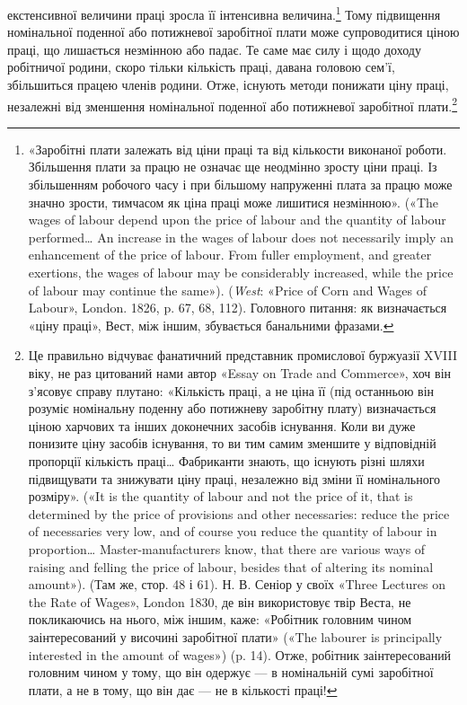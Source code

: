 \parcont{}  %
екстенсивної величини праці зросла її інтенсивна величина.\footnote{
«Заробітні плати залежать від ціни праці та від кількости виконаної
роботи. Збільшення плати за працю не означає ще неодмінно зросту
ціни праці. Із збільшенням робочого часу і при більшому напруженні
плата за працю може значно зрости, тимчасом як ціна праці може лишитися
незмінною». («The wages of labour depend upon the price of labour
and the quantity of labour performed\dots{} An increase in the wages of
labour does not necessarily imply an enhancement of the price of labour.
From fuller employment, and greater exertions, the wages of labour may
be considerably increased, while the price of labour may continue the same»).
(\emph{West}: «Price of Corn and Wages of Labour», London. 1826, p. 67, 68, 112).
Головного питання: як визначається «ціну праці», Вест, між іншим,
збувається банальними фразами.
}
Тому підвищення номінальної поденної або потижневої заробітної
плати може супроводитися ціною праці, що лишається
незмінною або падає. Те саме має силу і щодо доходу робітничої
родини, скоро тільки кількість праці, давана головою сем’ї,
збільшиться працею членів родини. Отже, існують методи понижати
ціну праці, незалежні від зменшення номінальної поденної
або потижневої заробітної плати.\footnote{
Це правильно відчуває фанатичний представник промислової
буржуазії XVIII віку, не раз цитований нами автор «Essay on Trade
and Commerce», хоч він з’ясовує справу плутано: «Кількість праці,
а не ціна її (під останньою він розуміє номінальну поденну або потижневу
заробітну плату) визначається ціною харчових та інших доконечних засобів
існування. Коли ви дуже понизите ціну засобів існування, то ви
тим самим зменшите у відповідній пропорції кількість праці\dots{} Фабриканти
знають, що існують різні шляхи підвищувати та знижувати ціну
праці, незалежно від зміни її номінального розміру». («It is the quantity
of labour and not the price of it, that is determined by the price of provisions
and other necessaries: reduce the price of necessaries very low, and
of course you reduce the quantity of labour in proportion\dots{} Master-manufacturers
know, that there are various ways of raising and felling the
price of labour, besides that of altering its nominal amount»). (Там же,
стор. 48 і 61). Н. В. Сеніор у своїх «Three Lectures on the Rate of Wages»,
London 1830, де він використовує твір Веста, не покликаючись на
нього, між іншим, каже: «Робітник головним чином заінтересований
у височині заробітної плати» («The labourer is principally interested
in the amount of wages») (p. 14). Отже, робітник заінтересований головним
чином у тому, що він одержує — в номінальній сумі заробітної плати,
а не в тому, що він дає — не в кількості праці!
}

